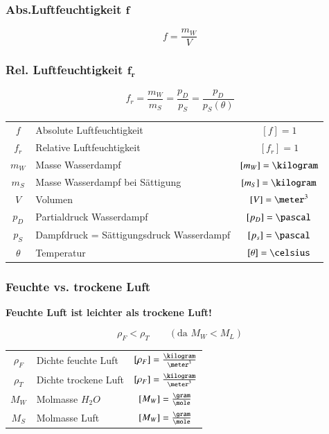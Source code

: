\begin{minipage}[t]{0.48\columnwidth}
	\subsubsection{Abs.Luftfeuchtigkeit $\bm{f}$}

	\vspace{-0.2cm}

	$$ \boxed{ f = \frac{m_W}{V}  } $$
\end{minipage}
\hfill
\begin{minipage}[t]{0.48\columnwidth}
	\subsubsection{Rel. Luftfeuchtigkeit $\boldsymbol{f_r}$}

	\vspace{-0.2cm}

	$$ \boxed{ f_r = \frac{m_W}{m_S} = \frac{p_D}{p_S} = \frac{p_D}{p_S(\theta)} } $$
\end{minipage}

\medskip

\begin{tabular}{c l c}
	$f$ 		& Absolute Luftfeuchtigkeit 				& $[f] = 1$ 			\\
	$f_r$ 		& Relative Luftfeuchtigkeit 				& $[f_r] = 1$ 			\\
	$m_W$ 		& Masse Wasserdampf 						& $[m_W] = \kilogram$ 	\\
	$m_S$ 		& Masse Wasserdampf bei Sättigung 			& $[m_S] = \kilogram$ 	\\
	$V$ 		& Volumen 									& $[V] = \meter^3$ 		\\
	$p_D$ 		& Partialdruck Wasserdampf 					& $[p_D] = \pascal$ 	\\
	$p_S$ 		& Dampfdruck = Sättigungsdruck Wasserdampf 	& $[p_s] = \pascal$ 	\\
	$\theta$ 	& Temperatur 								& $[\theta] = \celsius$
\end{tabular}


\subsubsection{Feuchte vs. trockene Luft}

\textbf{Feuchte Luft ist leichter als trockene Luft!}

$$ \boxed{ \rho_F < \rho_T } \qquad (\text{da } M_W < M_L) $$

\renewcommand{\arraystretch}{1.3}
\begin{tabular}{c l c}
	$\rho_F$	& Dichte feuchte Luft 	& $[\rho_F] = \frac{\kilogram}{\meter^3}$	\\
	$\rho_T$	& Dichte trockene Luft 	& $[\rho_F] = \frac{\kilogram}{\meter^3}$	\\
	$M_W$ 		& Molmasse $H_2O$ 		& $[M_W] = \frac{\gram}{\mole}$ 			\\
	$M_S$ 		& Molmasse Luft 		& $[M_W] = \frac{\gram}{\mole}$
\end{tabular}
\renewcommand{\arraystretch}{1}



